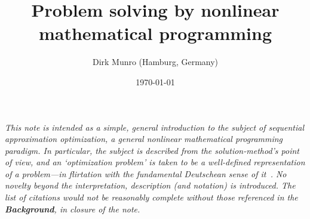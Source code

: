 \documentclass[11pt]{article}
\title{Problem solving by nonlinear mathematical programming}
\author{Dirk Munro (Hamburg, Germany)}
\date{\today }
\begin{document}
\maketitle





\emph{This note is intended as a simple, general introduction to the subject of {sequential approximation optimization}, a general nonlinear mathematical programming paradigm. In particular, the subject is described from the solution-method's point of view, and an `optimization problem' is taken to be a well-defined representation of a \emph{problem}---in flirtation with the fundamental Deutschean sense of it~\cite{deutsch2011fabric}. No novelty beyond the interpretation, description (and notation) is introduced. The list of citations would not be reasonably complete without those referenced in the \textbf{Background}, in closure of the note.}

\end{document}
